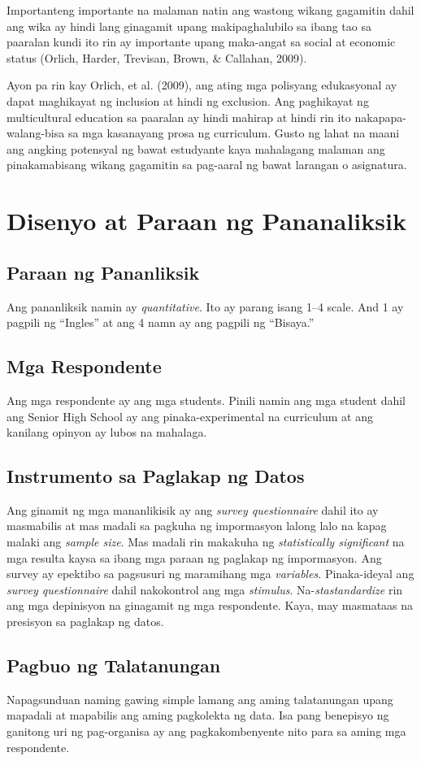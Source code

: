 \documentclass [11pt] {report}
\begin{document}
Importanteng importante na malaman natin ang wastong wikang gagamitin dahil ang
wika ay hindi lang ginagamit upang makipaghalubilo sa ibang tao sa paaralan
kundi ito rin ay importante upang maka-angat sa social at economic status
(Orlich, Harder, Trevisan, Brown, \& Callahan, 2009).

Ayon pa rin kay Orlich, et al. (2009), ang ating mga polisyang edukasyonal ay
dapat maghikayat ng inclusion at hindi ng exclusion. Ang paghikayat ng
multicultural education sa paaralan ay hindi mahirap at hindi rin ito
nakapapa-walang-bisa sa mga kasanayang prosa ng curriculum. Gusto ng lahat na
maani ang angking potensyal ng bawat estudyante kaya mahalagang malaman ang
pinakamabisang wikang gagamitin sa pag-aaral ng bawat larangan o asignatura.
\chapter{Disenyo at Paraan ng Pananaliksik}
\section{Paraan ng Pananliksik}
Ang pananliksik namin ay \emph{quantitative}. Ito ay parang isang 1--4 scale.
And 1 ay pagpili ng ``Ingles'' at ang 4 namn ay ang pagpili ng ``Bisaya.''
\section{Mga Respondente}
Ang mga respondente ay ang mga \glspl{student}. Pinili namin ang mga
\gls{student} dahil ang Senior High School ay ang  pinaka-experimental na
curriculum at ang kanilang opinyon ay lubos na mahalaga.
\section{Instrumento sa Paglakap ng Datos}
Ang ginamit ng mga mananlikisik ay ang \emph{survey questionnaire} dahil ito ay
masmabilis at mas madali sa pagkuha ng impormasyon lalong lalo na kapag malaki
ang \emph{sample size}. Mas madali rin makakuha ng \emph{statistically
  significant} na mga resulta kaysa sa ibang mga paraan ng paglakap ng
impormasyon. Ang survey ay epektibo sa pagsusuri ng maramihang mga
\emph{variables}. Pinaka-ideyal ang \emph{survey questionnaire } dahil
nakokontrol ang mga \emph{stimulus}. Na-\emph{stastandardize} rin ang mga
depinisyon na ginagamit ng mga respondente. Kaya, may masmataas na presisyon sa
paglakap ng datos.

\section{Pagbuo ng Talatanungan}
Napagsunduan naming gawing simple lamang ang aming talatanungan upang mapadali
at mapabilis ang aming pagkolekta ng data. Isa pang benepisyo ng ganitong uri ng
pag-organisa ay ang pagkakombenyente nito para sa aming mga respondente.
\end{document}
